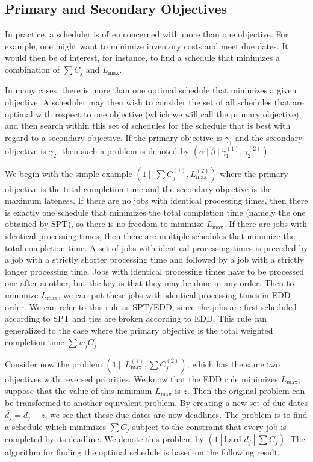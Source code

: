 \subsection{Primary and Secondary Objectives} \label{subsec:5.2}
In practice, a scheduler is often concerned with more than one objective. 
For example, one might want to minimize inventory costs and meet due dates. 
It would then be of interest, for instance, to find a schedule that minimizes a 
combination of $\sum C_j$ and $L_{\max}$. 

In many cases, there is more than one optimal schedule that minimizes a 
given objective. A scheduler may then wish to consider the set of all 
schedules that are optimal with respect to one objective (which 
we will call the primary objective), and then search within this set of 
schedules for the schedule that is best with regard to a secondary objective. 
If the primary objective is $\gamma_1$ and the secondary objective is 
$\gamma_2$, then such a problem is denoted by 
$(\alpha~|~\beta~|~\gamma_1^{(1)}, \gamma_2^{(2)})$.

We begin with the simple example $(1~||~\sum C_j^{(1)}, L_{\max}^{(2)})$ 
where the primary objective is the total completion time and the secondary 
objective is the maximum lateness. If there are no jobs with identical 
processing times, then there is exactly one schedule that minimizes the 
total completion time (namely the one obtained by SPT), so there is 
no freedom to minimize $L_{\max}$. If there are jobs with identical processing 
times, then there are multiple schedules that minimize the total completion 
time. A set of jobs with identical processing times is preceded by a job with a 
strictly shorter processing time and followed by a job with a strictly longer
processing time. Jobs with identical processing times have to be processed 
one after another, but the key is that they may be done in any order. 
Then to minimize $L_{\max}$, we can put these jobs with identical processing 
times in EDD order. We can refer to this rule as SPT/EDD, since the jobs are 
first scheduled according to SPT and ties are broken according to EDD. This 
rule can generalized to the case where the primary objective is 
the total weighted completion time $\sum w_j C_j$. 

Consider now the problem $(1~||~L_{\max}^{(1)}, \sum C_j^{(2)})$, which 
has the same two objectives with reversed priorities. We know that 
the EDD rule minimizes $L_{\max}$; suppose that the value of this minimum 
$L_{\max}$ is $z$. Then the original problem can be transformed to 
another equivalent problem. By creating a new set of due dates 
$\overline{d_j} = d_j + z$, we see that these due dates are now deadlines. 
The problem is to find a schedule which minimizes $\sum C_j$ subject to 
the constraint that every job is completed by its deadline. We denote 
this problem by $(1~|~\text{hard } d_j~|~\sum C_j)$. The algorithm 
for finding the optimal schedule is based on the following result. 

